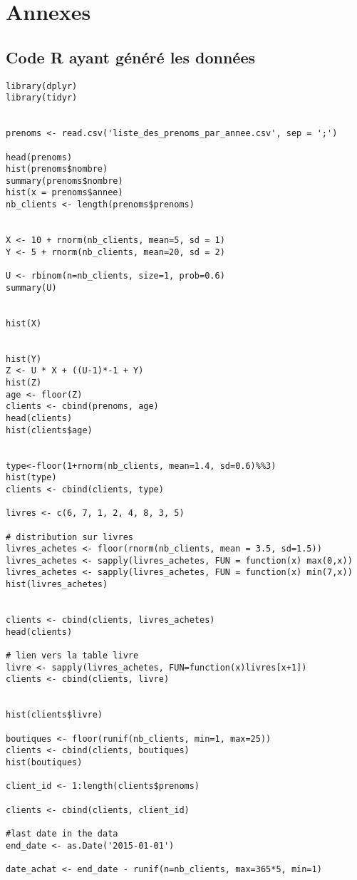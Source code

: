 \chapter{Annexes}
\section{Code R ayant généré les données}

\lstset{language=bash}
\lstset{frame=shadowbox}
\begin{lstlisting}
library(dplyr)
library(tidyr)


prenoms <- read.csv('liste_des_prenoms_par_annee.csv', sep = ';')

head(prenoms)
hist(prenoms$nombre)
summary(prenoms$nombre)
hist(x = prenoms$annee)
nb_clients <- length(prenoms$prenoms)


X <- 10 + rnorm(nb_clients, mean=5, sd = 1)
Y <- 5 + rnorm(nb_clients, mean=20, sd = 2)

U <- rbinom(n=nb_clients, size=1, prob=0.6)
summary(U)


hist(X)


hist(Y)
Z <- U * X + ((U-1)*-1 + Y)
hist(Z)
age <- floor(Z)
clients <- cbind(prenoms, age)
head(clients)
hist(clients$age)


type<-floor(1+rnorm(nb_clients, mean=1.4, sd=0.6)%%3)
hist(type)
clients <- cbind(clients, type)

livres <- c(6, 7, 1, 2, 4, 8, 3, 5)

# distribution sur livres
livres_achetes <- floor(rnorm(nb_clients, mean = 3.5, sd=1.5))
livres_achetes <- sapply(livres_achetes, FUN = function(x) max(0,x))
livres_achetes <- sapply(livres_achetes, FUN = function(x) min(7,x))
hist(livres_achetes)


clients <- cbind(clients, livres_achetes)
head(clients)

# lien vers la table livre
livre <- sapply(livres_achetes, FUN=function(x)livres[x+1])
clients <- cbind(clients, livre)


hist(clients$livre)

boutiques <- floor(runif(nb_clients, min=1, max=25))
clients <- cbind(clients, boutiques)
hist(boutiques)

client_id <- 1:length(clients$prenoms)

clients <- cbind(clients, client_id)

#last date in the data
end_date <- as.Date('2015-01-01')

date_achat <- end_date - runif(n=nb_clients, max=365*5, min=1)



\end{lstlisting}
